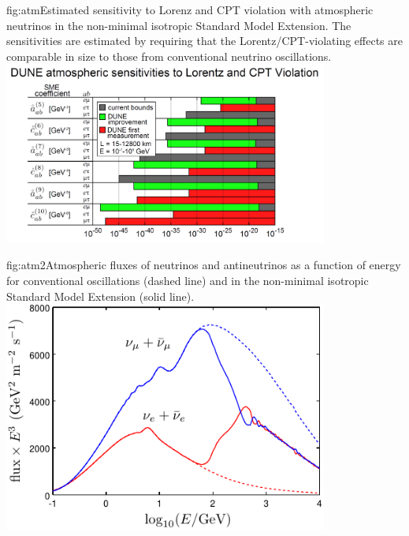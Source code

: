 \begin{dunefigure}{fig:atm}{Estimated sensitivity to Lorenz and CPT violation with atmospheric neutrinos in the non-minimal isotropic Standard Model Extension. The sensitivities are estimated by requiring that the Lorentz/CPT-violating effects are comparable in size to
those from conventional neutrino oscillations.}
\includegraphics[width=0.8\textwidth]{graphics/DUNE-atm.pdf}
\end{dunefigure}

\begin{dunefigure}{fig:atm2}{Atmospheric fluxes of neutrinos and antineutrinos as a function of energy for conventional oscillations (dashed line) and in the non-minimal isotropic Standard Model Extension (solid line).}
\includegraphics[width=0.8\textwidth]{graphics/DUNE-atm2.pdf}
\end{dunefigure}


